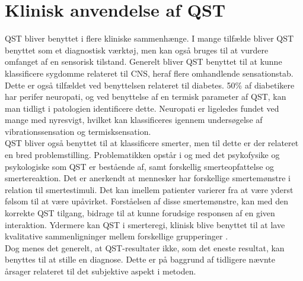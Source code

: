 \section{Klinisk anvendelse af QST}
QST bliver benyttet i flere kliniske sammenhænge. I mange tilfælde bliver QST benyttet som et diagnostisk værktøj, men kan også bruges til at vurdere omfanget af en sensorisk tilstand. Generelt bliver QST benyttet til at kunne klassificere sygdomme relateret til CNS, heraf flere omhandlende sensationstab. Dette er også tilfældet ved benyttelsen relateret til diabetes. 50\% af diabetikere har perifer neuropati, og ved benyttelse af en termisk parameter af QST, kan man tidligt i patologien identificere dette. Neuropati er ligeledes fundet ved mange med nyresvigt, hvilket kan klassificeres igennem undersøgelse af vibrationssensation og termisksensation. \citep{Yarnitsky1997} \citep{Yarnitsky2006} \\
QST bliver også benyttet til at klassificere smerter, men til dette er der relateret en bred problemstilling. Problematikken opstår i og med det psykofysike og psykologiske som QST er bestående af, samt forskellig smerteopfattelse og smertereaktion. \citep{Yarnitsky1997} Det er anerkendt at mennesker har forskellige smertemønstre i relation til smertestimuli. Det kan imellem patienter varierer fra at være yderst følsom til at være upåvirket. Forståelsen af disse smertemønstre, kan med den korrekte QST tilgang, bidrage til at kunne forudsige responsen af en given interaktion. \citep{Yarnitsky2006} Ydermere kan QST i smerteregi, klinisk blive benyttet til at lave kvalitative sammenligninger mellem forskellige grupperinger \citep{Arendt-Nielsen2009}. \\
Dog menes det generelt, at QST-resultater ikke, som det eneste resultat, kan benyttes til at stille en diagnose. Dette er på baggrund af tidligere nævnte årsager relateret til det subjektive aspekt i metoden. \citep{Yarnitsky2006}

